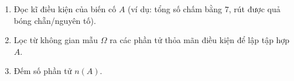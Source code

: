 \begin{enumerate}
\item Đọc kĩ điều kiện của biến cố $A$ (ví dụ: tổng số chấm bằng $7$, rút được quả bóng chẵn/nguyên tố).
\item Lọc từ không gian mẫu $\Omega$ ra các phần tử thỏa mãn điều kiện để lập tập hợp $A$.
\item Đếm số phần tử $n(A)$.
\end{enumerate}
